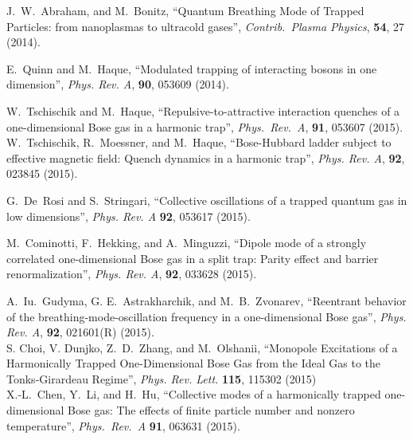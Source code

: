 \documentclass[a4paper, onecolumn]{revtex4-1}
\begin{document}
\begin{thebibliography}{1}
 J.~W.~Abraham, and M.~Bonitz, ``Quantum Breathing Mode of Trapped Particles:
  from nanoplasmas to ultracold gases'', {\em Contrib.\ Plasma Physics}, \textbf{54}, 27
  (2014).


E.~Quinn and M.~Haque, 
``Modulated trapping of interacting bosons in one dimension'',  
{\em Phys. Rev. A}, {\bf 90}, 053609 (2014). 


 W.~Tschischik and M.~Haque, ``Repulsive-to-attractive interaction
  quenches of a one-dimensional Bose gas in a harmonic trap'', {\em Phys.\ Rev.~A}, \textbf{91},
  053607 (2015).
%
\\
% 
W.~Tschischik, R.~Moessner, and M.~Haque, ``Bose-Hubbard ladder
  subject to effective magnetic field: Quench dynamics in a harmonic trap'',
{\em Phys. Rev. A},  {\bf 92}, 023845 (2015). 






G.~De~Rosi and S.~Stringari, ``Collective oscillations of a trapped quantum gas in low dimensions'', 
{\em Phys. Rev. A} {\bf 92}, 053617 (2015).


 M.~Cominotti, F.~Hekking, and A.~Minguzzi, 
``Dipole mode of a strongly correlated one-dimensional Bose gas in a split trap: Parity effect and
barrier renormalization'', 
{\em Phys. Rev. A}, {\bf 92}, 033628 (2015). 
  
A.~Iu.~Gudyma, G. E.~Astrakharchik, and M.~B.~Zvonarev, ``Reentrant behavior of the
breathing-mode-oscillation frequency in a one-dimensional Bose gas'', 
{\em Phys. Rev. A}, \textbf{92}, 021601(R) (2015). 
%
\\ 
%
S. Choi, V. Dunjko, Z.~D.~Zhang, and M.~Olshanii,
``Monopole Excitations of a Harmonically Trapped One-Dimensional Bose Gas from the Ideal Gas to the
Tonks-Girardeau Regime'', 
{\em Phys. Rev. Lett.} \textbf{115}, 115302 (2015)
%
\\
%
X.-L.~Chen, Y.~Li, and H.~Hu, 
``Collective modes of a harmonically trapped one-dimensional Bose gas: The effects of finite particle
number and nonzero temperature'', 
{\em Phys.\ Rev.\ A} \textbf{91}, 063631 (2015).  




\end{thebibliography}
\end{document}
